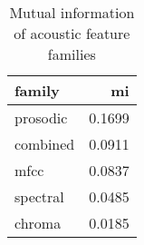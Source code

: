 \begin{table}
\caption{Mutual information of acoustic feature families}
\label{tab:mi_scores}
\begin{tabular}{lr}
\toprule
family & mi \\
\midrule
prosodic & 0.1699 \\
combined & 0.0911 \\
mfcc & 0.0837 \\
spectral & 0.0485 \\
chroma & 0.0185 \\
\bottomrule
\end{tabular}
\end{table}

